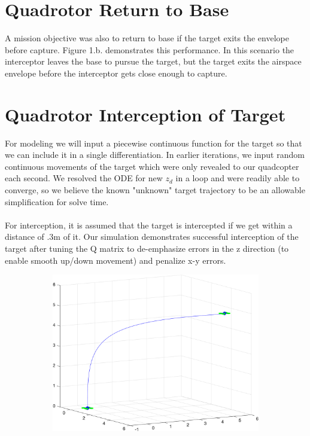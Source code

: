 \documentclass{article}
\begin{document}
\begin{multicols}{2}
\section*{Quadrotor Return to Base}
A mission objective was also to return to base if the target exits the envelope before capture.  Figure 1.b. demonstrates this performance. In this scenario the interceptor leaves the base to pursue the target, but the target exits the airspace envelope before the interceptor gets close enough to capture.

\section*{Quadrotor Interception of Target}
For modeling we will input a piecewise continuous function for the target so that we can include it in a single differentiation.  In earlier iterations, we input random continuous movements of the target which were only revealed to our quadcopter each second.  We resolved the ODE for new $z_d$ in a loop and were readily able to converge, so we believe the known "unknown" target trajectory to be an allowable simplification for solve time.\\
\\
For interception, it is assumed that the target is intercepted if we get within a distance of .3m of it.   Our simulation demonstrates successful interception of the target after tuning the Q matrix to de-emphasize errors in the z direction (to enable smooth up/down movement) and penalize x-y errors.  
\begin{figure}[H]
\centering
\begin{subfigure}[b]{0.31\textwidth}
    \centering
    \includegraphics[width = 1\textwidth]{images/MoveAndHover.png}

\end{subfigure}
\end{figure}
\end{multicols}
\end{document}
